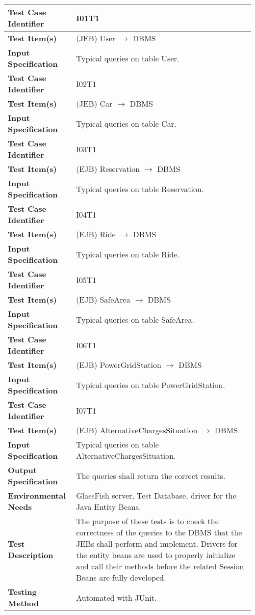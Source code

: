 \begin{longtable}{p{} | p{}}
\hline
\textbf{Test Case Identifier} & I01T1\\
\hline
\textbf{Test Item(s)} & (JEB) User $\rightarrow$ DBMS \\
\hline
\textbf{Input Specification} & Typical queries on table User. \\
\hline
\hline
\textbf{Test Case Identifier} & I02T1\\
\hline
\textbf{Test Item(s)} & (JEB) Car $\rightarrow$ DBMS \\
\hline
\textbf{Input Specification} & Typical queries on table Car. \\
\hline
\hline
\textbf{Test Case Identifier} & I03T1\\
\hline
\textbf{Test Item(s)} & (EJB) Reservation $\rightarrow$ DBMS \\
\hline
\textbf{Input Specification} & Typical queries on table Reservation. \\
\hline
\hline
\textbf{Test Case Identifier} & I04T1\\
\hline
\textbf{Test Item(s)} & (EJB) Ride $\rightarrow$ DBMS \\
\hline
\textbf{Input Specification} & Typical queries on table Ride. \\
\hline
\hline
\textbf{Test Case Identifier} & I05T1\\
\hline
\textbf{Test Item(s)} & (EJB) SafeArea $\rightarrow$ DBMS \\
\hline
\textbf{Input Specification} & Typical queries on table SafeArea. \\
\hline
\hline
\textbf{Test Case Identifier} & I06T1\\
\hline
\textbf{Test Item(s)} & (EJB) PowerGridStation $\rightarrow$ DBMS \\
\hline
\textbf{Input Specification} & Typical queries on table PowerGridStation. \\
\hline
\hline
\textbf{Test Case Identifier} & I07T1\\
\hline
\textbf{Test Item(s)} & (EJB) AlternativeChargesSituation $\rightarrow$ DBMS \\
\hline
\textbf{Input Specification} & Typical queries on table AlternativeChargesSituation. \\
\hline
\hline
\textbf{Output Specification} & The queries shall return the correct results. \\
\hline
\textbf{Environmental Needs} & GlassFish server, Test Database, driver for the Java Entity Beans. \\
\hline
\textbf{Test Description} & The purpose of these tests is to check the correctness of the queries to the DBMS that the JEBs shall perform and implement. Drivers for the entity beans are used to properly initialize and call their methods before the related Session Beans are fully developed. \\
\hline
\textbf{Testing Method} & Automated with JUnit. \\
\hline
\end{longtable}